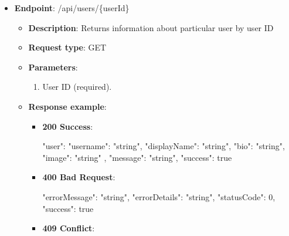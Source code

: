 \begin{itemize}
    \item \textbf{Endpoint}: /api/users/\{userId\}
    \begin{itemize}
        \item \textbf{Description}: Returns information about particular user by user ID
        \item \textbf{Request type}: GET
        \item \textbf{Parameters}:
        \begin{enumerate}
            \item User ID (required).
        \end{enumerate}
        \item \textbf{Response example}:
        \begin{itemize}
            \item \textbf{200 Success}:
            \begin{spverbatim}
            {
                "user": {
                    "username": "string",
                    "displayName": "string",
                    "bio": "string",
                    "image": "string"
                },
                "message": "string",
                "success": true
            }
            \end{spverbatim}
            \item \textbf{400 Bad Request}:
            \begin{spverbatim}
            {
                "errorMessage": "string",
                "errorDetails": "string",
                "statusCode": 0,
                "success": true
            }
            \end{spverbatim}
            \item \textbf{409 Conflict}:


\end{itemize}
\end{itemize}
\end{itemize}
